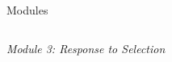 \documentclass[final]{beamer}
\newlength{\onecolwid}
\newlength{\twocolwid}
\begin{document}
\begin{frame}[t]
\begin{columns}[t]
\begin{column}{\twocolwid}
\begin{block}{Modules}
%
%
%
%
%
%
%
%
%
%
%
%
%






\vspace{2cm}

\begin{columns}[t,totalwidth=\twocolwid]



\begin{column}{\onecolwid}


\textit{Module 3: Response to Selection}

\vspace{0.5cm}

\begin{center}
\begin{figure}
\end{figure}
\end{center}


\vspace{-1cm}


\end{column}
\end{columns}
\end{block}
\end{column}
\end{columns}
\end{frame}
\end{document}
